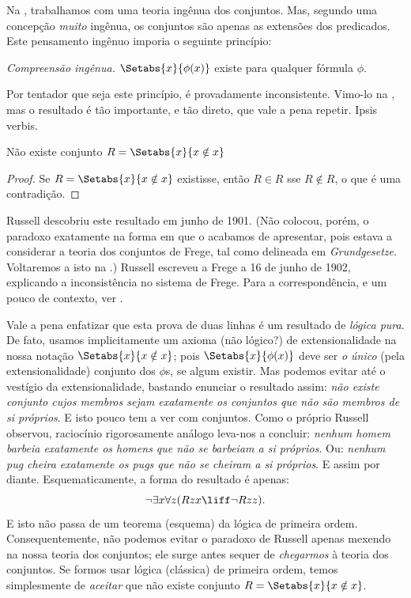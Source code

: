 \documentclass[../../../include/open-logic-section]{subfiles}
\begin{document}

Na , trabalhamos com uma teoria ingênua dos conjuntos. Mas,
segundo uma concepção \emph{muito} ingênua, os conjuntos são apenas as
extensões dos predicados. Este pensamento ingênuo imporia o
seguinte princípio:

\begin{defish}
  \emph{Compreensão ingênua.} $\Setabs{x}{\phi(x)}$ existe para qualquer fórmula $\phi$.
\end{defish}

Por tentador que seja este princípio, é provadamente inconsistente. Vimo-lo na , mas o resultado é tão importante, e tão direto, que vale a pena repetir. Ipsis verbis.

\begin{thm}
Não existe conjunto $R = \Setabs{x}{x \notin x}$
\end{thm}

\begin{proof}
Se $R = \Setabs{x}{x \notin x}$ existisse, então
$R \in R$ sse $R \notin R$, o que é uma contradição.
\end{proof}

Russell descobriu este resultado em junho de 1901. (Não colocou, porém,
o paradoxo exatamente na forma em que o acabamos de apresentar, pois estava
a considerar a teoria dos conjuntos de Frege, tal como delineada em \emph{Grundgesetze}. Voltaremos a isto na .) Russell escreveu a
Frege a 16 de junho de 1902, explicando a inconsistência no sistema de
Frege. Para a correspondência, e um pouco de contexto, ver
\citet[pp.~124--8]{Heijenoort1967}. 

Vale a pena enfatizar que esta prova de duas linhas é um resultado de
\emph{lógica pura}. De fato, usamos implicitamente um axioma (não lógico?) de extensionalidade na nossa notação $\Setabs{x}{x \notin x}$; pois $\Setabs{x}{\phi(x)}$ deve ser \emph{o único} (pela extensionalidade) conjunto dos $\phi$s, se algum existir. Mas podemos evitar até o vestígio da extensionalidade, bastando enunciar o resultado assim:
\emph{não existe conjunto cujos membros sejam exatamente os conjuntos que não são membros de si próprios}. E isto pouco tem a ver com conjuntos. Como o próprio Russell observou, raciocínio rigorosamente análogo
leva-nos a concluir: \emph{nenhum homem barbeia exatamente os homens que
não se barbeiam a si próprios}. Ou: \emph{nenhum pug cheira exatamente os pugs que
não se cheiram a si próprios}. E assim por diante. Esquematicamente, a forma do
resultado é apenas: 
\[
\lnot \exists x \forall z(Rzx \liff \lnot R zz).
\]
E isto não passa de um teorema (esquema) da lógica de primeira ordem. Consequentemente,
não podemos evitar o paradoxo de Russell apenas mexendo na nossa teoria
dos conjuntos; ele surge antes sequer de \emph{chegarmos} à teoria dos conjuntos. Se formos
usar lógica (clássica) de primeira ordem, temos simplesmente de
\emph{aceitar} que não existe conjunto $R = \Setabs{x}{x\notin x}$. 
\end{document}
